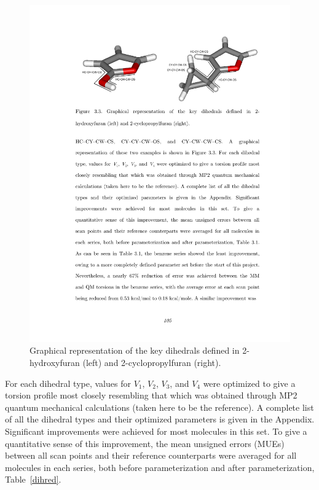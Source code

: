 \documentclass[12pt]{report}
\def\tablab{Table}\def\tabslab{\tablab s}
\newcommand*\tbl[1]{\tablab~\ref{#1}}
\begin{document}
\begin{figure}[ht]
\centering
\includegraphics[scale=0.999]{figures/pdf/dihex2.pdf}
\caption{Graphical representation of the key dihedrals defined in 2-hydroxyfuran (left) and 2-cyclopropylfuran (right).}
\label{dihex2}
\end{figure}

For each dihedral type, values for $V_1$, $V_2$, $V_3$, and $V_4$ were optimized to give a torsion profile most closely resembling that which was obtained through MP2 quantum mechanical calculations (taken here to be the reference). A complete list of all the dihedral types and their optimized parameters is given in the Appendix. Significant improvements were achieved for most molecules in this set. To give a quantitative sense of this improvement, the mean unsigned errors (MUEs) between all scan points and their reference counterparts were averaged for all molecules in each series, both before parameterization and after parameterization, \tbl{dihred}. 
\end{document}
